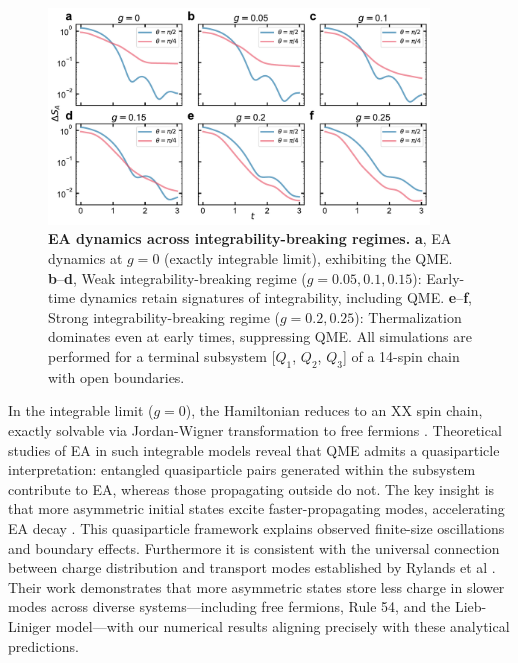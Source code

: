 \documentclass[reprint,superscriptaddress,preprintnumbers,longbibliography,
amsmath,amssymb,aps,floatfix,pra,twocolumn, tightenlines %
]{revtex4-2}
\begin{document}
    \begin{figure}[t]
    \centering
    \includegraphics[width=0.9\textwidth]{suppFig/SuppFig1_tunable_r.pdf}
    \caption{ \textbf{EA dynamics across integrability-breaking regimes.} 
        \textbf{a}, EA dynamics at $g = 0$ (exactly integrable limit), exhibiting the QME. 
        \textbf{b}--\textbf{d}, Weak integrability-breaking regime ($g = 0.05, 0.1, 0.15$): Early-time dynamics retain signatures of integrability, including QME. 
        \textbf{e}--\textbf{f}, Strong integrability-breaking regime ($g = 0.2, 0.25$): Thermalization dominates even at early times, suppressing QME. 
        All simulations are performed for a terminal subsystem [$Q_1$, $Q_2$, $Q_3$] of a 14-spin chain with open boundaries.
    }
    \label{fig:tunable.r}
    \end{figure}
    
    In the integrable limit ($g=0$), the Hamiltonian reduces to an XX spin chain, exactly solvable via Jordan-Wigner transformation to free fermions \cite{introduction_XYchain}. Theoretical studies of EA in such integrable models reveal that QME admits a quasiparticle interpretation: entangled quasiparticle pairs generated within the subsystem contribute to EA, whereas those propagating outside do not. The key insight is that more asymmetric initial states excite faster-propagating modes, accelerating EA decay \cite{NRP2025}. This quasiparticle framework explains observed finite-size oscillations and boundary effects. Furthermore it is consistent with the universal connection between charge distribution and transport modes established by Rylands et al \cite{Integrable_PRL}. Their work demonstrates that more asymmetric states store less charge in slower modes across diverse systems—including free fermions, Rule 54, and the Lieb-Liniger model—with our numerical results aligning precisely with these analytical predictions.
    
\end{document}
